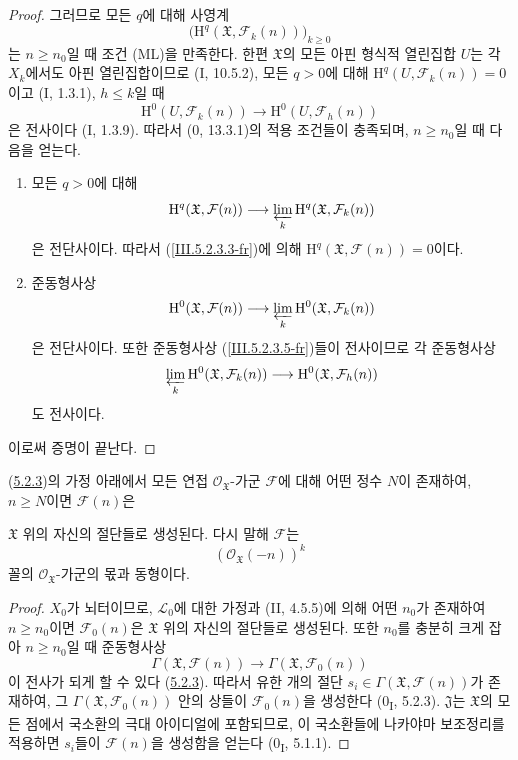 \begin{proof}
그러므로 모든 $q$에 대해 사영계
\[
\bigl(\mathrm H^q(\mathfrak X,\mathcal F_k(n))\bigr)_{k\geq0}
\]
는 $n\geq n_0$일 때 조건 (ML)을 만족한다. 한편
$\mathfrak X$의 모든 아핀 형식적 열린집합 $U$는 각 $X_k$에서도
아핀 열린집합이므로 (I, 10.5.2), 모든 $q>0$에 대해
$\mathrm H^q(U,\mathcal F_k(n))=0$이고 (I, 1.3.1),
$h\leq k$일 때
\[
\mathrm H^0(U,\mathcal F_k(n))
\longrightarrow\mathrm H^0(U,\mathcal F_h(n))
\]
은 전사이다 (I, 1.3.9). 따라서 (0, 13.3.1)의 적용 조건들이
충족되며, $n\geq n_0$일 때 다음을 얻는다.
\begin{enumerate}
\item[$1^\circ$]
모든 $q>0$에 대해
\[
\mathrm H^q(\mathfrak X,\mathcal F(n))
\longrightarrow
\varprojlim_k\mathrm H^q(\mathfrak X,\mathcal F_k(n))
\]
은 전단사이다. 따라서 (\ref{III.5.2.3.3-fr})에 의해
$\mathrm H^q(\mathfrak X,\mathcal F(n))=0$이다.
\item[$2^\circ$]
준동형사상
\[
\mathrm H^0(\mathfrak X,\mathcal F(n))
\longrightarrow
\varprojlim_k\mathrm H^0(\mathfrak X,\mathcal F_k(n))
\]
은 전단사이다. 또한 준동형사상
(\ref{III.5.2.3.5-fr})들이 전사이므로 각 준동형사상
\[
\varprojlim_k\mathrm H^0(\mathfrak X,\mathcal F_k(n))
\longrightarrow
\mathrm H^0(\mathfrak X,\mathcal F_h(n))
\]
도 전사이다.
\end{enumerate}
이로써 증명이 끝난다.
\end{proof}

\begin{corollary}[5.2.4]
\label{III.5.2.4-fr}
(\hyperref[III.5.2.3-fr]{5.2.3})의 가정 아래에서 모든 연접
$\mathcal O_{\mathfrak X}$-가군 $\mathcal F$에 대해 어떤 정수
$N$이 존재하여, $n\geq N$이면 $\mathcal F(n)$은


$\mathfrak X$ 위의 자신의 절단들로 생성된다. 다시 말해
$\mathcal F$는
\[
(\mathcal O_{\mathfrak X}(-n))^k
\]
꼴의 $\mathcal O_{\mathfrak X}$-가군의 몫과 동형이다.
\end{corollary}

\begin{proof}
$X_0$가 뇌터이므로, $\mathcal L_0$에 대한 가정과 (II, 4.5.5)에
의해 어떤 $n_0$가 존재하여 $n\geq n_0$이면
$\mathcal F_0(n)$은 $\mathfrak X$ 위의 자신의 절단들로 생성된다.
또한 $n_0$를 충분히 크게 잡아 $n\geq n_0$일 때 준동형사상
\[
\Gamma(\mathfrak X,\mathcal F(n))
\longrightarrow
\Gamma(\mathfrak X,\mathcal F_0(n))
\]
이 전사가 되게 할 수 있다
(\hyperref[III.5.2.3-fr]{5.2.3}). 따라서 유한 개의 절단
$s_i\in\Gamma(\mathfrak X,\mathcal F(n))$가 존재하여, 그
$\Gamma(\mathfrak X,\mathcal F_0(n))$ 안의 상들이
$\mathcal F_0(n)$을 생성한다 (0\textsubscript{I}, 5.2.3).
$\mathfrak J$는 $\mathfrak X$의 모든 점에서 국소환의 극대
아이디얼에 포함되므로, 이 국소환들에 나카야마 보조정리를 적용하면
$s_i$들이 $\mathcal F(n)$을 생성함을 얻는다
(0\textsubscript{I}, 5.1.1).
\end{proof}

